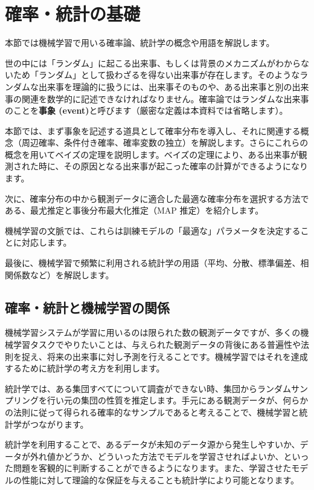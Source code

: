 \chapter{確率・統計の基礎}


本節では機械学習で用いる確率論、統計学の概念や用語を解説します。


世の中には「ランダム」に起こる出来事、もしくは背景のメカニズムがわからないため「ランダム」として扱わざるを得ない出来事が存在します。そのようなランダムな出来事を理論的に扱うには、出来事そのものや、ある出来事と別の出来事の関連を数学的に記述できなければなりません。確率論ではランダムな出来事のことを\textbf{事象 (event)}と呼びます（厳密な定義は本資料では省略します）。


本節では、まず事象を記述する道具として確率分布を導入し、それに関連する概念（周辺確率、条件付き確率、確率変数の独立）を解説します。さらにこれらの概念を用いてベイズの定理を説明します。ベイズの定理により、ある出来事が観測された時に、その原因となる出来事が起こった確率の計算ができるようになります。

次に、確率分布の中から観測データに適合した最適な確率分布を選択する方法である、最尤推定と事後分布最大化推定（MAP 推定）を紹介します。

機械学習の文脈では、これらは訓練モデルの「最適な」パラメータを決定することに対応します。

最後に、機械学習で頻繁に利用される統計学の用語（平均、分散、標準偏差、相関係数など）を解説します。



\section{確率・統計と機械学習の関係}


機械学習システムが学習に用いるのは限られた数の観測データですが、多くの機械学習タスクでやりたいことは、与えられた観測データの背後にある普遍性や法則を捉え、将来の出来事に対し予測を行えることです。機械学習ではそれを達成するために統計学の考え方を利用します。


統計学では、ある集団すべてについて調査ができない時、集団からランダムサンプリングを行い元の集団の性質を推定します。手元にある観測データが、何らかの法則に従って得られる確率的なサンプルであると考えることで、機械学習と統計学がつながります。

統計学を利用することで、あるデータが未知のデータ源から発生しやすいか、データが外れ値かどうか、どういった方法でモデルを学習させればよいか、といった問題を客観的に判断することができるようになります。また、学習させたモデルの性能に対して理論的な保証を与えることも統計学により可能となります。

